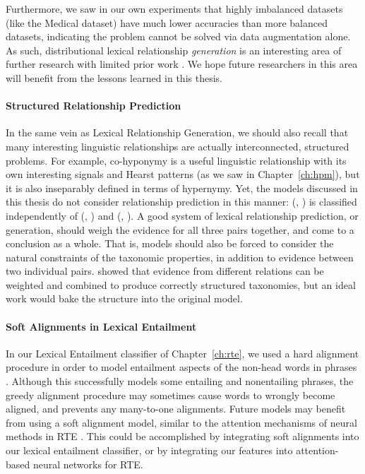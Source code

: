 Furthermore, we saw in our own experiments that highly imbalanced datasets
(like the Medical dataset) have much lower accuracies than more balanced
datasets, indicating the problem cannot be solved via data augmentation alone.
As such, distributional lexical relationship {\em generation} is an interesting
area of further research with limited prior work
\cite{fu:2014:acl,nayak:2015:techreport,espinosaanke:2016:emnlp}. We hope
future researchers in this area will benefit from the lessons learned in this
thesis.

\paragraph{Structured Relationship Prediction}

In the same vein as Lexical Relationship Generation, we should also recall that
many interesting linguistic relationships are actually interconnected,
structured problems. For example, co-hyponymy is a useful linguistic
relationship with its own interesting signals and Hearst patterns (as we saw in
Chapter~\ref{ch:hpm}), but it is also inseparably defined in terms of
hypernymy. Yet, the models discussed in this thesis do not consider relationship
prediction in this manner: (, ) is classified independently
of (, ) and (, ). A good system of
lexical relationship prediction, or generation, should weigh the evidence for
all three pairs together, and come to a conclusion as a whole. That is, models
should also be forced to consider the natural constraints of the taxonomic
properties, in addition to evidence between two individual pairs.
 showed that evidence from different relations can
be weighted and combined to produce correctly structured taxonomies, but an
ideal work would bake the structure into the original model.

\paragraph{Soft Alignments in Lexical Entailment}

In our Lexical Entailment classifier of Chapter~\ref{ch:rte}, we used a
hard alignment procedure in order to model entailment aspects of the
non-head words in phrases . Although this
successfully models some entailing and nonentailing phrases, the greedy
alignment procedure may sometimes cause words to wrongly become aligned, and
prevents any many-to-one alignments. Future models may benefit from using
a soft alignment model, similar to the attention mechanisms of neural methods
in RTE \cite{bowman:2015:emnlp,parikh:2016:emnlp}. This could be accomplished
by integrating soft alignments into our lexical entailment classifier, or
by integrating our features into attention-based neural networks for RTE.

